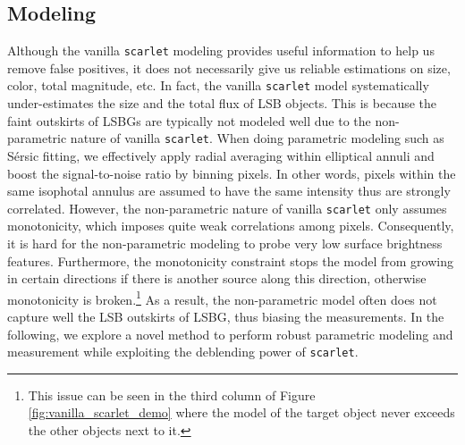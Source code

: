 \documentclass[twocolumn,astrosymb,twocolappendix]{aastex631}
\newcommand{\code}[1]{\texttt{#1}}
\newcommand{\sersic}{S\'ersic}
\begin{document}
\begin{CJK*}{UTF8}{gbsn}

\subsection{Modeling}\label{sec:modeling}


Although the vanilla \code{scarlet} modeling provides useful information to help us remove false positives, it does not necessarily give us reliable estimations on size, color, total magnitude, etc. In fact, the vanilla \code{scarlet} model systematically under-estimates the size and the total flux of LSB objects. This is because the faint outskirts of LSBGs are typically not modeled well due to the non-parametric nature of vanilla \code{scarlet}. When doing parametric modeling such as \sersic{} fitting, we effectively apply radial averaging within elliptical annuli and boost the signal-to-noise ratio by binning pixels. In other words, pixels within the same isophotal annulus are assumed to have the same intensity thus are strongly correlated. However, the non-parametric nature of vanilla \code{scarlet} only assumes monotonicity, which imposes quite weak correlations among pixels. Consequently, it is hard for the non-parametric modeling to probe very low surface brightness features. Furthermore, the monotonicity constraint stops the model from growing in certain directions if there is another source along this direction, otherwise monotonicity is broken.\footnote{This issue can be seen in the third column of Figure \ref{fig:vanilla_scarlet_demo} where the model of the target object never exceeds the other objects next to it.} As a result, the non-parametric model often does not capture well the LSB outskirts of LSBG, thus biasing the measurements. In the following, we explore a novel method to perform robust parametric modeling and measurement while exploiting the deblending power of \code{scarlet}.


\end{CJK*}
\end{document}
